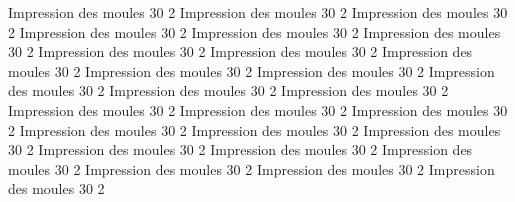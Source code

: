  {Impression des moules} {30} {2}
 {Impression des moules} {30} {2}
 {Impression des moules} {30} {2}
 {Impression des moules} {30} {2}
 {Impression des moules} {30} {2}
 {Impression des moules} {30} {2}
 {Impression des moules} {30} {2}
 {Impression des moules} {30} {2}
 {Impression des moules} {30} {2}
 {Impression des moules} {30} {2}
 {Impression des moules} {30} {2}
%
 {Impression des moules} {30} {2}
 {Impression des moules} {30} {2}
 {Impression des moules} {30} {2}
 {Impression des moules} {30} {2}
 {Impression des moules} {30} {2}
 {Impression des moules} {30} {2}
 {Impression des moules} {30} {2}
 {Impression des moules} {30} {2}
 {Impression des moules} {30} {2}
 {Impression des moules} {30} {2}
 {Impression des moules} {30} {2}
 {Impression des moules} {30} {2}
 {Impression des moules} {30} {2}
 {Impression des moules} {30} {2}
 {Impression des moules} {30} {2}
%
%
%
%
%
%
%
%
%
%
%
%
%


